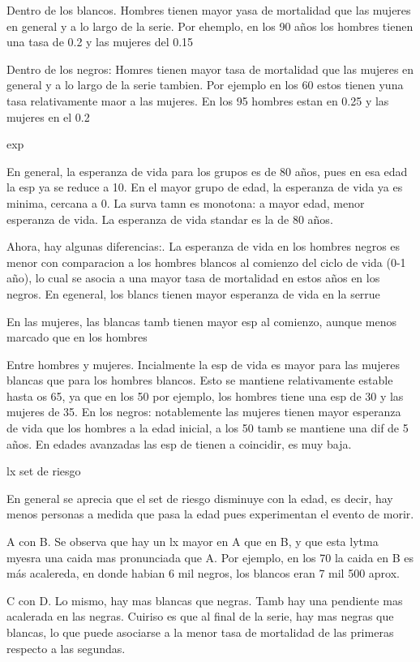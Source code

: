 \documentclass[
  12pt,
]{article}
\begin{document}
Dentro de los blancos. Hombres tienen mayor yasa de mortalidad que las
mujeres en general y a lo largo de la serie. Por ehemplo, en los 90 años
los hombres tienen una tasa de 0.2 y las mujeres del 0.15

Dentro de los negros: Homres tienen mayor tasa de mortalidad que las
mujeres en general y a lo largo de la serie tambien. Por ejemplo en los
60 estos tienen yuna tasa relativamente maor a las mujeres. En los 95
hombres estan en 0.25 y las mujeres en el 0.2

exp

En general, la esperanza de vida para los grupos es de 80 años, pues en
esa edad la esp ya se reduce a 10. En el mayor grupo de edad, la
esperanza de vida ya es minima, cercana a 0. La surva tamn es monotona:
a mayor edad, menor esperanza de vida. La esperanza de vida standar es
la de 80 años.

Ahora, hay algunas diferencias:. La esperanza de vida en los hombres
negros es menor con comparacion a los hombres blancos al comienzo del
ciclo de vida (0-1 año), lo cual se asocia a una mayor tasa de
mortalidad en estos años en los negros. En egeneral, los blancs tienen
mayor esperanza de vida en la serrue

En las mujeres, las blancas tamb tienen mayor esp al comienzo, aunque
menos marcado que en los hombres

Entre hombres y mujeres. Incialmente la esp de vida es mayor para las
mujeres blancas que para los hombres blancos. Esto se mantiene
relativamente estable hasta os 65, ya que en los 50 por ejemplo, los
hombres tiene una esp de 30 y las mujeres de 35. En los negros:
notablemente las mujeres tienen mayor esperanza de vida que los hombres
a la edad inicial, a los 50 tamb se mantiene una dif de 5 años. En
edades avanzadas las esp de tienen a coincidir, es muy baja.

lx set de riesgo

En general se aprecia que el set de riesgo disminuye con la edad, es
decir, hay menos personas a medida que pasa la edad pues experimentan el
evento de morir.

A con B. Se observa que hay un lx mayor en A que en B, y que esta lytma
myesra una caida mas pronunciada que A. Por ejemplo, en los 70 la caida
en B es más acalereda, en donde habian 6 mil negros, los blancos eran 7
mil 500 aprox.

C con D. Lo mismo, hay mas blancas que negras. Tamb hay una pendiente
mas acalerada en las negras. Cuiriso es que al final de la serie, hay
mas negras que blancas, lo que puede asociarse a la menor tasa de
mortalidad de las primeras respecto a las segundas.
\end{document}
